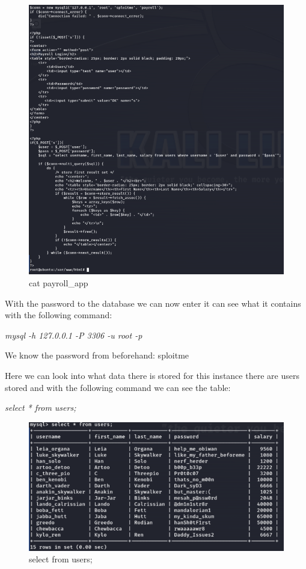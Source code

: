 \begin{figure}[H]
      \centering
      \includegraphics[width=\linewidth]{pic/cat payroll_app.png}
      \caption{cat payroll\_app}
      \label{fig:cat payroll_app}
\end{figure}

With the password to the database we can now enter it can see what it contains with the
following command:

\textit{mysql -h 127.0.0.1 -P 3306 -u root -p}

We know the password from beforehand: sploitme

Here we can look into what data there is stored for this instance there are users stored and
with the following command we can see the table:

\textit{select * from users;}

\begin{figure}[H]
      \centering
      \includegraphics[width=0.8\linewidth]{pic/select from users;.png}
      \caption{select from users;}
      \label{fig:select from users;}
\end{figure}


